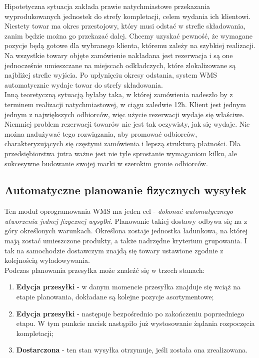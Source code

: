 		Hipotetyczna sytuacja zakłada prawie natychmiastowe przekazania wyprodukowanych jednostek do strefy kompletacji,
		celem wydania ich klientowi. Niestety towar ma okres przestojowy, który musi odstać w strefie składowania, 
		zanim będzie można go przekazać dalej. Chcemy uzyskać pewność, że wymagane pozycje będą gotowe
		dla wybranego klienta, któremu zależy na szybkiej realizacji. Na wszystkie towary objęte zamówienie nakładana
		jest rezerwacja i są one jednocześnie umieszczane na miejscach odkładczych, które zlokalizowane są najbliżej
		strefie wyjścia. Po upłynięciu okresy odstania, system WMS automatycznie wydaje towar do strefy składowania.\\
		Inną teoretyczną sytuacją byłaby taka, w której zamówienia nadeszło by z terminem realizacji natychmiastowej, w ciągu
		zaledwie 12h. Klient jest jednym jednym z największych odbiorców, więc użycie rezerwacji wydaje się właściwe. \\
		
		Niemniej problem rezerwacji towarów nie jest tak oczywisty, jak się wydaje. Nie można nadużywać tego rozwiązania,
		aby promować odbiorców, charakteryzujących się częstymi zamówienia i lepszą strukturą płatności. Dla przedsiębiorstwa
		jutra ważne jest nie tyle sprostanie wymaganiom kilku, ale sukcesywne budowanie swojej marki w szerokim gronie
		odbiorców. 
	\subsection{Automatyczne planowanie fizycznych wysyłek}
		Ten moduł oprogramowania WMS ma jeden cel - \emph{dokonać automatycznego utworzenia jednej fizycznej wysyłki}.
		Planowanie takiej dostawy odbywa się na z góry określonych warunkach. Określona zostaje jednostka ładunkowa, na
		której mają zostać umieszczone produkty, a także nadrzędne kryterium grupowania. I tak na samochodzie dostawczym
		znajdą się towary ustawione zgodnie z kolejnością wyładowywania. \\
		
		Podczas planowania przesyłka może znaleźć się w trzech stanach:
		\begin{enumerate}
			\item \textbf{Edycja przesyłki} - w danym momencie przesyłka znajduje się wciąż na etapie planowania, dokładane
			są kolejne pozycje asortymentowe;
			\item \textbf{Edycja przesyłki} - następuje bezpośrednio po zakończeniu poprzedniego etapu. \linebreak
			W tym punkcie nacisk nastąpiło już wystosowanie żądania rozpoczęcia kompletacji;
			\item \textbf{Dostarczona} - ten stan wysyłka otrzymuje, jeśli została ona zrealizowana.
		\end{enumerate}

